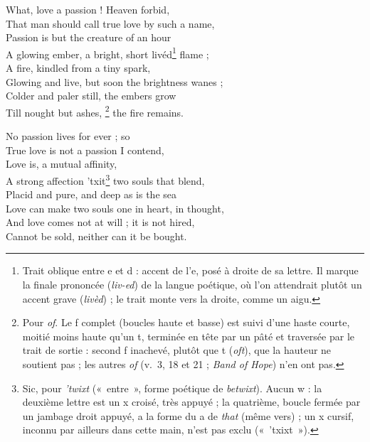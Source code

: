 \begin{LJlettre}
\noindent What, love a passion ! Heaven forbid,\\
That man should call true love by such a name,\\
Passion is but the creature of an hour\\
A glowing ember, a bright, short livéd\footnote{Trait oblique entre e et d : accent de l'e, posé à droite de sa lettre. Il marque la finale prononcée (\textit{liv-ed}) de la langue poétique, où l'on attendrait plutôt un accent grave (\textit{livèd}) ; le trait monte vers la droite, comme un aigu.} flame ;\\
A fire, kindled from a tiny spark,\\
Glowing and live, but soon the brightness wanes ;\\
Colder and paler still, the embers grow\\
Till nought but ashes, \footnote{Pour \textit{of}. Le f complet (boucles haute et basse) est suivi d'une haste courte, moitié moins haute qu'un t, terminée en tête par un pâté et traversée par le trait de sortie : second f inachevé, plutôt que t (\textit{oft}), que la hauteur ne soutient pas ; les autres \textit{of} (v.~3, 18 et 21 ; \textit{Band of Hope}) n'en ont pas.} the fire remains.

\medskip
\noindent No passion lives for ever ; so\\
True love is not a passion I contend,\\
Love is, a mutual affinity,\\
A strong affection 'txit\footnote{Sic, pour \textit{'twixt} («~entre~», forme poétique de \textit{betwixt}). Aucun w : la deuxième lettre est un x croisé, très appuyé ; la quatrième, boucle fermée par un jambage droit appuyé, a la forme du a de \textit{that} (même vers) ; un x cursif, inconnu par ailleurs dans cette main, n'est pas exclu («~'txixt~»).} two souls that blend,\\
Placid and pure, and deep as is the sea\\
Love can make two souls one in heart, in thought,\\
And love comes not at will ; it is not hired,\\
Cannot be sold, neither can it be bought.

\medskip
\noindent [p.~2]\par\nopagebreak[4]


\end{LJlettre}
